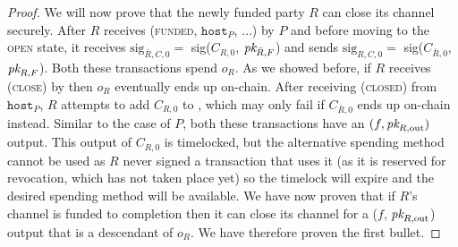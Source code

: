 \begin{proof}
  We will now prove that the newly funded party $R$ can close its channel
  securely. After $R$ receives (\textsc{funded}, $\texttt{host}_P$, $\dots$) by
  $P$ and before moving to the \textsc{open} state, it receives
  $\mathrm{sig}_{\bar{R}, C, 0} =$ sig($C_{R, 0}$, $\textit{pk}_{\bar{R}, F}$) and sends
  $\mathrm{sig}_{R, C, 0} =$ sig($C_{\bar{R}, 0}$, $\textit{pk}_{R, F}$). Both these
  transactions spend $o_R$. As we showed before, if $R$ receives
  (\textsc{close}) by \environment then $o_R$ eventually ends up on-chain. After
  receiving (\textsc{closed}) from $\texttt{host}_P$, $R$ attempts to add $C_{R,
  0}$ to \ledger, which may only fail if $C_{\bar{R}, 0}$ ends up on-chain
  instead.  Similar to the case of $P$, both these transactions have an $(f,
  \textit{pk}_{R, \mathrm{out}})$ output. This output of $C_{R, 0}$ is timelocked, but
  the alternative spending method cannot be used as $R$ never signed a
  transaction that uses it (as it is reserved for revocation, which has not
  taken place yet) so the timelock will expire and the desired spending method
  will be available. We have now proven that if $R$'s channel is funded to
  completion then it can close its channel for a ($f$, $\textit{pk}_{R, \mathrm{out}}$)
  output that is a descendant of $o_R$. We have therefore proven the first
  bullet.


\end{proof}
